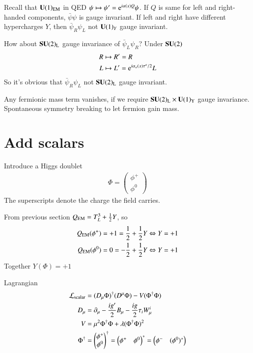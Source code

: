Recall that $\mathbf{U}(1)_{\text{EM}}$ in QED $\psi \mapsto \psi'=\mathrm{e}^{i\alpha(x)Q}\psi$. If $Q$ is same for left and right-handed components, $\bar\psi \psi$ is gauge invariant. If left and right have different hypercharges $Y$, then $\bar\psi_R \psi_L$ not $\mathbf{U}(1)_Y$ gauge invariant.

How about $\mathbf{SU}(2)_\text{L}$ gauge invariance of $\bar\psi_L \psi_R$? Under $\mathbf{SU}(2)$
\begin{align*}
   R &\mapsto R' = R \\
   L &\mapsto L' = \mathrm{e}^{i\alpha_a(x) \tau^a /2} L
\end{align*}
So it's obvious that $\bar\psi_R \psi_L$ not $\mathbf{SU}(2)_\text{L}$ gauge invariant.

Any fermionic mass term vanishes, if we require $\mathbf{SU}(2)_\text{L} \times \mathbf{U}(1)_\text{Y}$ gauge invariance. Spontaneous symmetry breaking to let fermion gain mass.

\section{Add scalars}
Introduce a Higgs doublet
\begin{align}
   \Phi = \begin{pmatrix} \phi^+ \\ \phi^0 \end{pmatrix}
\end{align}
The superscripts denote the charge the field carries.

From previous section $Q_{\text{EM}} = T^3_L + \frac{1}{2}Y $, so 
\begin{align*}
   Q_{\text{EM}}(\phi^+) &= +1 =  \frac{1}{2} + \frac{1}{2} Y \Leftrightarrow Y=+1 \\
   Q_{\text{EM}}(\phi^0) &= 0 = -\frac{1}{2} + \frac{1}{2} Y \Leftrightarrow Y=+1
\end{align*}
Together $Y(\Phi) = + 1$

Lagrangian
\begin{align}
   \begin{split}
    \mathcal{L}_\text{scalar} &= (D_\mu \Phi)^\dagger (D^\mu \Phi) - V(\Phi^\dagger \Phi) \\
   D_\mu &= \partial_\mu - \frac{ig'}{2} B_\mu - \frac{ig}{2} \tau_i W^i_\mu \\
   V &= \mu^2 \Phi^\dagger \Phi + \lambda (\Phi^\dagger \Phi)^2 \\
   \Phi^\dagger &= \begin{pmatrix} \phi^+ \\ \phi^0 \end{pmatrix}^\dagger = \begin{pmatrix} \phi^+ & \phi^0\end{pmatrix}^* = \begin{pmatrix} \phi^- & (\phi^0)^* \end{pmatrix}
   \end{split}
\end{align}

